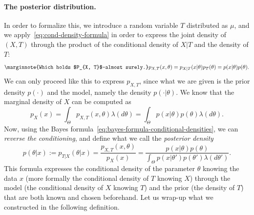 \paragraph{The posterior distribution.} %


In order to formalize this, we introduce a random variable $T$ distributed as $\mu$, and
we apply~\eqref{eq:cond-density-formula} in order to express the joint density of $(X, T)$ through the product of the conditional density of $X | T$ and the density of $T$:
\begin{equation}
	\label{eq:joint-as-conditional-distribution}
	\marginnote{Which holds $P_{X, T}$-almost surely.}
	p_{X, T}(x, \theta) = p_{X | T}(x | \theta) p_T(\theta) = p(x | \theta) p(\theta).
\end{equation}
We can only proceed like this to express $p_{X, T}$, since what we are given is the prior density $p(\cdot)$ and the model, namely the density $p(\cdot | \theta)$.
We know that the marginal density of $X$ can be computed as
\begin{equation*}
	p_X(x) = \int_\Theta p_{X, T}(x, \theta) \lambda(d \theta) 
	= \int_\Theta p(x | \theta) p(\theta) \lambda(d \theta).
\end{equation*}
Now, using the Bayes formula~\eqref{eq:bayes-formula-conditional-densities}, we can \emph{reverse the conditioning}, and define what we call the \emph{posterior density}
\begin{equation*}
	p(\theta | x) := p_{T | X}(\theta | x) = \frac{p_{X, T}(x, \theta)}{p_X(x)} 
	=  \frac{p(x | \theta) p(\theta)}{\int_\Theta p(x | \theta') p(\theta') \lambda(d \theta')}.
\end{equation*}
This formula expresses the conditional density of the parameter $\theta$ knowing the data $x$ (more formally the conditional density of $T$ knowing $X$) through the model (the conditional density of $X$ knowing $T$) and the prior (the density of $T$) that are both known and chosen beforehand.
Let us wrap-up what we constructed in the following definition.


